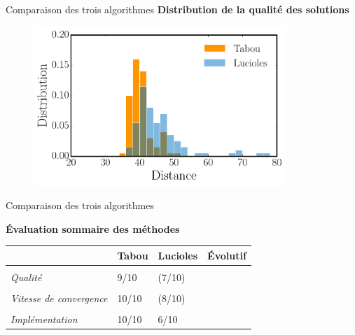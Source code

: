 \documentclass{beamer}
\begin{document}
\begin{frame}{Comparaison des trois algorithmes}
  \textbf{Distribution de la qualité des solutions}
  \begin{figure}[h!]
    \centering
    \includegraphics[width=0.85\textwidth]{figures/distri_distance.pdf}
  \end{figure}
\end{frame}

\begin{frame}{Comparaison des trois algorithmes}
  \begin{center}\textbf{Évaluation sommaire des méthodes}\end{center}
  \begin{table}
  \centering
  \begin{tabular}{C{2.6cm}C{2cm}C{2cm}C{2cm}}
  &\textbf{Tabou} & \textbf{Lucioles} & \textbf{Évolutif}\\
  \hline\\
  \textit{Qualité} & 9/10 & (7/10) &\\\\
  \textit{Vitesse de convergence} & 10/10 & (8/10) & \\\\
   \textit{Implémentation} & 10/10 & 6/10 & \\
  \end{tabular}
\end{table}
\end{frame}
\end{document}
